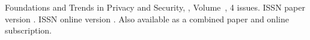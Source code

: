\journallibraryinfo
 {%
  Foundations and Trends\textsuperscript{\textregistered} in
Privacy and Security, ,
  Volume~, 4 issues.
  ISSN paper version .
  ISSN online version .
  Also available as a combined paper and online
  subscription.
 } 